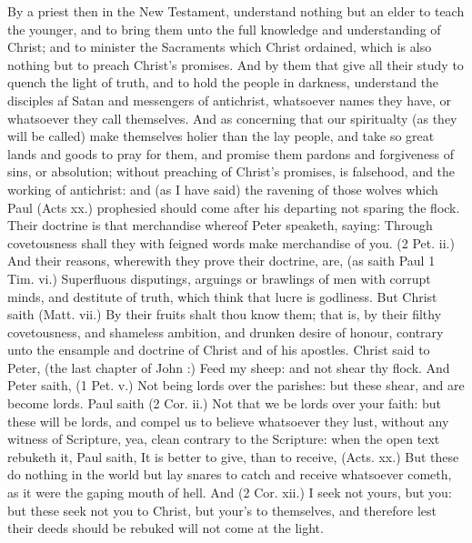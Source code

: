 By a priest then in the New Testament, understand nothing
but an elder to teach the younger, and to bring 
them unto the full knowledge and understanding of Christ; 
and to minister the Sacraments which Christ ordained, 
which is also nothing but to preach Christ's promises. 
And by them that give all their study to quench the light 
of truth, and to hold the people in darkness, understand 
the disciples af Satan and messengers of antichrist, whatsoever
names they have, or whatsoever they call themselves. 
And as concerning that our spiritualty (as they will be
called) make themselves holier than the lay people, and 
take so great lands and goods to pray for them, and promise
them pardons and forgiveness of sins, or absolution; 
without preaching of Christ's promises, is falsehood, and 
the working of antichrist: and (as I have said) the ravening
of those wolves which Paul (Acts xx.) prophesied 
should come after his departing not sparing the flock. 
Their doctrine is that merchandise whereof Peter speaketh,
saying: Through covetousness shall they with feigned words 
make merchandise of you. (2 Pet. ii.) And their reasons,
wherewith they prove their doctrine, are, (as saith Paul 
1 Tim. vi.) Superfluous disputings, arguings or brawlings of 
men with corrupt minds, and destitute of truth, which 
think that lucre is godliness. But Christ saith (Matt. vii.) 
By their fruits shalt thou know them; that is, by their 
filthy covetousness, and shameless ambition, and drunken 
desire of honour, contrary unto the ensample and doctrine 
of Christ and of his apostles. Christ said to Peter, (the 
last chapter of John :) Feed my sheep: and not shear thy 
flock. And Peter saith, (1 Pet. v.) Not being lords over 
the parishes: but these shear, and are become lords. Paul 
saith (2 Cor. ii.) Not that we be lords over your faith: 
but these will be lords, and compel us to believe whatsoever
they lust, without any witness of Scripture, yea, clean 
contrary to the Scripture: when the open text rebuketh it, 
Paul saith, It is better to give, than to receive, (Acts. xx.) 
But these do nothing in the world but lay snares to catch 
and receive whatsoever cometh, as it were the gaping 
mouth of hell. And (2 Cor. xii.) I seek not yours, but you: 
but these seek not you to Christ, but your's to themselves, 
and therefore lest their deeds should be rebuked will not 
come at the light. 

